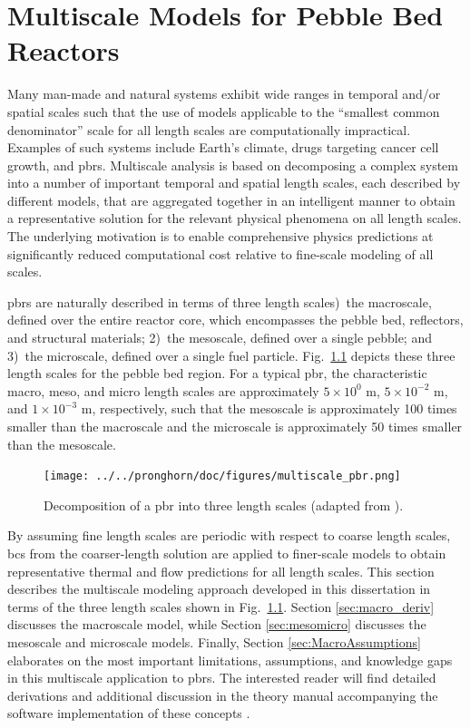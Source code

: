 \chapter{Multiscale Models for Pebble Bed Reactors}
\label{sec:PhysicalModels}

Many man-made and natural systems exhibit wide ranges in temporal and/or spatial scales such that the use of models applicable to the ``smallest common denominator'' scale for all length scales are computationally impractical. Examples of such systems include Earth's climate, drugs targeting cancer cell growth, and \glspl{pbr}. Multiscale analysis is based on decomposing a complex system into a number of important temporal and spatial length scales, each described by different models, that are aggregated together in an intelligent manner to obtain a representative solution for the relevant physical phenomena on all length scales. The underlying motivation is to enable comprehensive physics predictions at significantly reduced computational cost relative to fine-scale modeling of all scales. 

\glspl{pbr} are naturally described in terms of three length scales)~the macroscale, defined over the entire reactor core, which encompasses the pebble bed, reflectors, and structural materials; 2)~the mesoscale, defined over a single pebble; and 3)~the microscale, defined over a single fuel particle. Fig.\ \ref{fig:multiscale} depicts these three length scales for the pebble bed region. For a typical \gls{pbr}, the characteristic macro, meso, and micro length scales are approximately \(5\times10^0\) m, \(5\times10^{-2}\) m, and \(1\times10^{-3}\) m, respectively, such that the mesoscale is approximately 100 times smaller than the macroscale and the microscale is approximately 50 times smaller than the mesoscale. 

\begin{figure}[!h]
\centering
\texttt{[image: ../../pronghorn/doc/figures/multiscale\_pbr.png]}
\caption{Decomposition of a \gls{pbr} into three length scales (adapted from \cite{aufiero_2016,pebble_cut,pebble_uncut,triso_closeup,hales}).}
\label{fig:multiscale}
\end{figure}

By assuming fine length scales are periodic with respect to coarse length scales, \glspl{bc} from the coarser-length solution are applied to finer-scale models to obtain representative thermal and flow predictions for all length scales. This section describes the multiscale modeling approach developed in this dissertation in terms of the three length scales shown in Fig.\ \ref{fig:multiscale}. Section \ref{sec:macro_deriv} discusses the macroscale model, while Section \ref{sec:mesomicro} discusses the mesoscale and microscale models. Finally, Section \ref{sec:MacroAssumptions} elaborates on the most important limitations, assumptions, and knowledge gaps in this multiscale application to \glspl{pbr}. The interested reader will find detailed derivations and additional discussion in the theory manual accompanying the software implementation of these concepts \cite{novak_manual}. 

